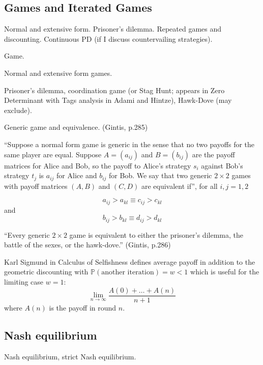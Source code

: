 \subsection{Games and Iterated Games}
Normal and extensive form. Prisoner's dilemma. Repeated games and discounting. Continuous PD (if I discuss countervailing strategies).

\begin{definition}
Game.
\end{definition}
\begin{definition}
Normal and extensive form games.
\end{definition}

\begin{example}
Prisoner's dilemma, coordination game (or Stag Hunt; appears in Zero Determinant with Tags analysis in Adami and Hintze), Hawk-Dove (may exclude).
\end{example}
\begin{definition}
Generic game and equivalence. (Gintis, p.285)

``Suppose a normal form game is generic in the sense that no two payoffs for the same player are equal. Suppose $A = (a_{ij})$ and $B = (b_{ij})$ are the payoff matrices for Alice and Bob, so the payoff to Alice's strategy $s_i$ against Bob's strategy $t_j$ is $a_{ij}$ for Alice and $b_{ij}$ for Bob. We say that two generic $2 \times 2$ games with payoff matrices $(A, B)$ and $(C, D)$ are equivalent if'', for all $i, j = 1, 2$

\[
a_{ij} > a_{kl} \equiv c_{ij} > c_{kl}
\]
and
\[
b_{ij} > b_{kl} \equiv d_{ij} > d_{kl}
\]


\end{definition}

\begin{proposition}
``Every generic $2 \times 2$ game is equivalent to either the prisoner's dilemma, the battle of the sexes, or the hawk-dove.'' (Gintis, p.286)
\end{proposition}

Karl Sigmund in Calculus of Selfishness defines average payoff in addition to the geometric discounting with
$
\mathbb{P}(\mbox{another iteration}) = w < 1
$
which is useful for the limiting case $w=1$:
\[
\lim_{n \rightarrow \infty} \frac{A(0) + \dots + A(n)}{n+1}
\]
where $A(n)$ is the payoff in round $n$.
\subsection{Nash equilibrium}
\begin{definition}
Nash equilibrium, strict Nash equilibrium.
\end{definition}

